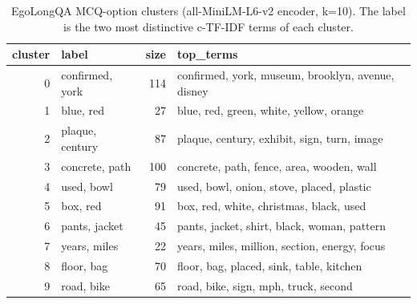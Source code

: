 \begin{table}[t]
\centering
\small
\caption{EgoLongQA MCQ-option clusters (all-MiniLM-L6-v2 encoder, k=10). The label is the two most distinctive c-TF-IDF terms of each cluster.}
\label{tab:clusters_mcq}
\begin{tabular}{rlrl}
\toprule
cluster & label & size & top\_terms \\
\midrule
0 & confirmed, york & 114 & confirmed, york, museum, brooklyn, avenue, disney \\
1 & blue, red & 27 & blue, red, green, white, yellow, orange \\
2 & plaque, century & 87 & plaque, century, exhibit, sign, turn, image \\
3 & concrete, path & 100 & concrete, path, fence, area, wooden, wall \\
4 & used, bowl & 79 & used, bowl, onion, stove, placed, plastic \\
5 & box, red & 91 & box, red, white, christmas, black, used \\
6 & pants, jacket & 45 & pants, jacket, shirt, black, woman, pattern \\
7 & years, miles & 22 & years, miles, million, section, energy, focus \\
8 & floor, bag & 70 & floor, bag, placed, sink, table, kitchen \\
9 & road, bike & 65 & road, bike, sign, mph, truck, second \\
\bottomrule
\end{tabular}
\end{table}
